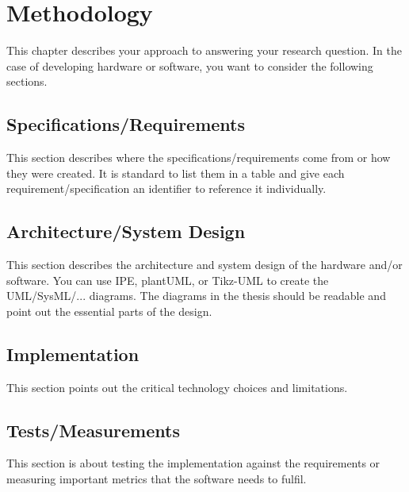 
\chapter{Methodology}
\label{chapter:methodology}

This chapter describes your approach to answering your research question. In the case of developing hardware or software, you want to consider the following sections.

\section{Specifications/Requirements}
\label{sec:specifications}

This section describes where the specifications/requirements come from or how they were created. It is standard to list them in a table and give each requirement/specification an identifier to reference it individually.

\section{Architecture/System Design}
\label{sec:design}

This section describes the architecture and system design of the hardware and/or software. You can use IPE, plantUML, or Tikz-UML to create the UML/SysML/... diagrams.
The diagrams in the thesis should be readable and point out the essential parts of the design.

\section{Implementation}
\label{sec:implementation}

This section points out the critical technology choices and limitations.

\section{Tests/Measurements}
\label{sec:measurements}

This section is about testing the implementation against the requirements or measuring important metrics that the software needs to fulfil.
